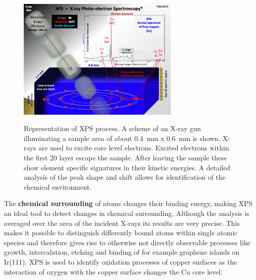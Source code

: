 \begin{figure}\centering
\includegraphics[width=0.7\textwidth]{./images/XPS_PHYSICS}
		\label{fig:XPS-excitation}
	
	\caption{Representation of XPS process. A scheme of an X-ray gun illuminating a sample area of about \SI{0.4}{\milli \meter} x \SI{0.6}{\milli \meter} is shown. X-rays are used to excite core level electrons. Excited electrons within the first 20 layer escape the sample. After leaving the sample these show element specific signatures in their kinetic energies. A detailed analysis of the peak shape and shift allows for identification of the chemical environment.}
	\label{fig:auger-core}
\end{figure}

\cite{zemlyanov_versatile_2018}
The  \textbf{chemical surrounding} of atoms changes their binding energy, making XPS an ideal tool to detect changes in chemical surrounding. Although the analysis is averaged over the area of the incident X-rays its results are very precise. This makes it possible to distinguish differently bound atoms within single atomic species and therefore gives rise to otherwise not directly observable processes like growth, intercalation, etching and binding of for example graphene islands on Ir(111)\cite{busse_graphene_2011-1,granas_oxygen_2012}. XPS is used to identify oxidation processes of copper surfaces as the interaction of oxygen with the copper surface changes the Cu core level.\cite{deroubaix_x-ray_1992}

